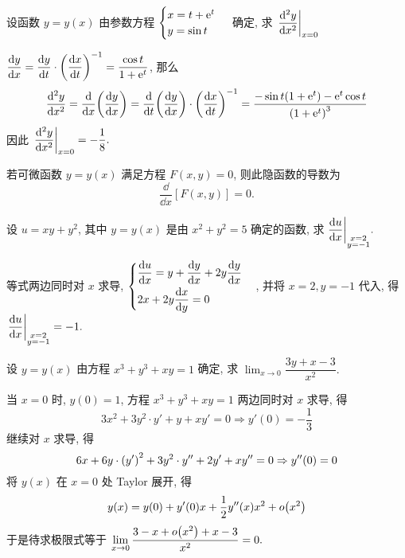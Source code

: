 \begin{example}[2017 数二]
    设函数 $y=y(x)$ 由参数方程 $\begin{cases}
            x=t+\mathrm{e}^t \\y=\sin t
        \end{cases}$ 确定, 求 $\displaystyle\eval{\dv[2]{y}{x}}_{x=0}$
\end{example}
\begin{solution}
    $\displaystyle\dv{y}{x}=\dv{y}{t}\cdot\qty(\dv{x}{t})^{-1}=\dfrac{\cos t}{1+\mathrm{e}^t}$, 那么
    $$\dv[2]{y}{x}=\dv{x}\qty(\dv{y}{x})=\dv{t}\qty(\dv{y}{x})\cdot\qty(\dv{x}{t})^{-1}=\dfrac{-\sin t\qty(1+\mathrm{e}^t)-\mathrm{e}^t\cos t}{\qty(1+\mathrm{e}^t)^3}$$
    因此 $\displaystyle\eval{\dv[2]{y}{x}}_{x=0}=-\dfrac{1}{8}.$
\end{solution}

\begin{theorem}[隐函数的导数]
    若可微函数 $y=y(x)$ 满足方程 $F(x,y)=0$, 则此隐函数的导数为
    $$\dfrac{\dd }{\dd x}[F(x,y)]=0.$$
\end{theorem}

\begin{example}
    设 $u=xy+y^2$, 其中 $y=y(x)$ 是由 $x^2+y^2=5$ 确定的函数, 求 $\displaystyle\dv{u}{x}\biggl |_{\substack{x=2\\y=-1}}.$
\end{example}
\begin{solution}
    等式两边同时对 $x$ 求导, $\begin{cases}
            \displaystyle \dv{u}{x}=y+\dv{y}{x}+2y\dv{y}{x} \\[6pt]
            \displaystyle 2x+2y\dv{x}{y} =0
        \end{cases}$, 并将 $x=2,y=-1$ 代入, 得 $\displaystyle\eval{\dv{u}{x}}_{\substack{x=2\\y=-1}}=-1.$
\end{solution}

\begin{example}
    设 $y=y(x)$ 由方程 $x^3+y^3+xy=1$ 确定, 求 $\displaystyle\lim_{x\to0}\dfrac{3y+x-3}{x^2}.$
\end{example}
\begin{solution}
    当 $x=0$ 时, $y(0)=1$,
    方程 $x^3+y^3+xy=1$ 两边同时对 $x$ 求导, 得 $$3x^2+3y^2\cdot y'+y+xy'=0\Rightarrow y'(0)=-\dfrac{1}{3}$$
    继续对 $x$ 求导, 得 $$6x+6y\cdot\qty(y')^2+3y^2\cdot y''+2y'+xy''=0\Rightarrow y''(0)=0$$
    将 $y(x)$ 在 $x=0$ 处 Taylor 展开, 得
    $$y(x)=y(0)+y'(0)x+\dfrac{1}{2}y''(x)x^2+o\qty(x^2)$$
    于是待求极限式等于 $\displaystyle\lim_{x\to0}\dfrac{3-x+o\qty(x^2)+x-3}{x^2}=0.$
\end{solution}

